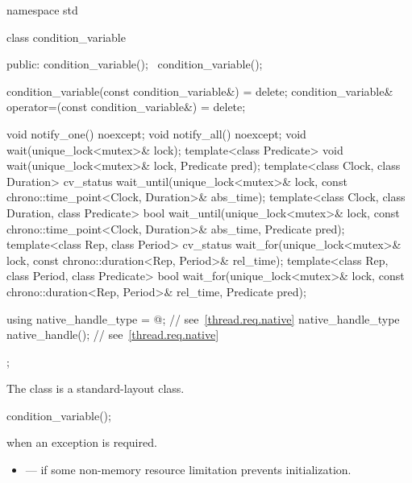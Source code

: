 %
\begin{codeblock}
namespace std {
  class condition_variable {
  public:
    condition_variable();
    ~condition_variable();

    condition_variable(const condition_variable&) = delete;
    condition_variable& operator=(const condition_variable&) = delete;

    void notify_one() noexcept;
    void notify_all() noexcept;
    void wait(unique_lock<mutex>& lock);
    template<class Predicate>
      void wait(unique_lock<mutex>& lock, Predicate pred);
    template<class Clock, class Duration>
      cv_status wait_until(unique_lock<mutex>& lock,
                           const chrono::time_point<Clock, Duration>& abs_time);
    template<class Clock, class Duration, class Predicate>
      bool wait_until(unique_lock<mutex>& lock,
                      const chrono::time_point<Clock, Duration>& abs_time,
                      Predicate pred);
    template<class Rep, class Period>
      cv_status wait_for(unique_lock<mutex>& lock,
                         const chrono::duration<Rep, Period>& rel_time);
    template<class Rep, class Period, class Predicate>
      bool wait_for(unique_lock<mutex>& lock,
                    const chrono::duration<Rep, Period>& rel_time,
                    Predicate pred);

    using native_handle_type = @\impdefnc@;          // see~\ref{thread.req.native}
    native_handle_type native_handle();                         // see~\ref{thread.req.native}
  };
}
\end{codeblock}

\pnum
The class  is a standard-layout class.

%
\begin{itemdecl}
condition_variable();
\end{itemdecl}

\begin{itemdescr}
\pnum
\throws
{} when an exception is required.

\pnum
\errors
\begin{itemize}
\item {} --- if some non-memory resource
limitation prevents initialization.
\end{itemize}
\end{itemdescr}

